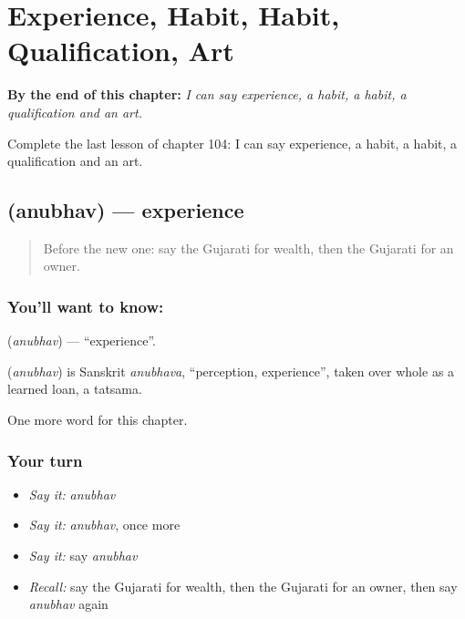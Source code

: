 
\chapter{Experience, Habit, Habit, Qualification, Art}
\label{ch:gu-experience-habit-habit-qualification-art}

\begin{chapteropening}
\textbf{By the end of this chapter:} \emph{I can say experience, a habit, a habit, a qualification and an art.}

Complete the last lesson of chapter 104: I can say experience, a habit, a habit, a qualification and an art.
\end{chapteropening}

\section[\texorpdfstring{\gu{અનુભવ} (anubhav)}{અનુભવ (anubhav)}]{ (anubhav) — experience}

\label{lesson:GU-C104-anubhav}



\begin{quote}
Before the new one: say the Gujarati for wealth, then the Gujarati for an owner.
\end{quote}

\subsection*{You'll want to know: }
\textbf{} (\emph{anubhav}) — \textquotedblleft{}experience\textquotedblright{}.

\begin{cousinweb}
\textbf{} (\emph{anubhav}) is Sanskrit \emph{anubhava}, \textquotedblleft{}perception, experience\textquotedblright{}, taken over whole as a learned loan, a tatsama.
\end{cousinweb}

\begin{grammarlens}[title={What you've built}]
One more word for this chapter.
\end{grammarlens}

\subsection*{Your turn}
\begin{itemize}
\raggedright
  \item \emph{Say it:} \emph{anubhav}
  \item \emph{Say it:} \emph{anubhav}, once more
  \item \emph{Say it:} say \emph{anubhav}
  \item \emph{Recall:} say the Gujarati for wealth, then the Gujarati for an owner, then say \emph{anubhav} again
\end{itemize}

